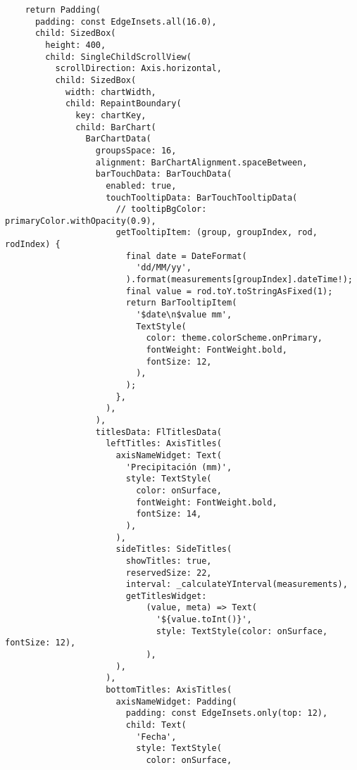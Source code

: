 \begin{verbatim}
    return Padding(
      padding: const EdgeInsets.all(16.0),
      child: SizedBox(
        height: 400,
        child: SingleChildScrollView(
          scrollDirection: Axis.horizontal,
          child: SizedBox(
            width: chartWidth,
            child: RepaintBoundary(
              key: chartKey,
              child: BarChart(
                BarChartData(
                  groupsSpace: 16,
                  alignment: BarChartAlignment.spaceBetween,
                  barTouchData: BarTouchData(
                    enabled: true,
                    touchTooltipData: BarTouchTooltipData(
                      // tooltipBgColor: primaryColor.withOpacity(0.9),
                      getTooltipItem: (group, groupIndex, rod, rodIndex) {
                        final date = DateFormat(
                          'dd/MM/yy',
                        ).format(measurements[groupIndex].dateTime!);
                        final value = rod.toY.toStringAsFixed(1);
                        return BarTooltipItem(
                          '$date\n$value mm',
                          TextStyle(
                            color: theme.colorScheme.onPrimary,
                            fontWeight: FontWeight.bold,
                            fontSize: 12,
                          ),
                        );
                      },
                    ),
                  ),
                  titlesData: FlTitlesData(
                    leftTitles: AxisTitles(
                      axisNameWidget: Text(
                        'Precipitación (mm)',
                        style: TextStyle(
                          color: onSurface,
                          fontWeight: FontWeight.bold,
                          fontSize: 14,
                        ),
                      ),
                      sideTitles: SideTitles(
                        showTitles: true,
                        reservedSize: 22,
                        interval: _calculateYInterval(measurements),
                        getTitlesWidget:
                            (value, meta) => Text(
                              '${value.toInt()}',
                              style: TextStyle(color: onSurface, fontSize: 12),
                            ),
                      ),
                    ),
                    bottomTitles: AxisTitles(
                      axisNameWidget: Padding(
                        padding: const EdgeInsets.only(top: 12),
                        child: Text(
                          'Fecha',
                          style: TextStyle(
                            color: onSurface,

\end{verbatim}
